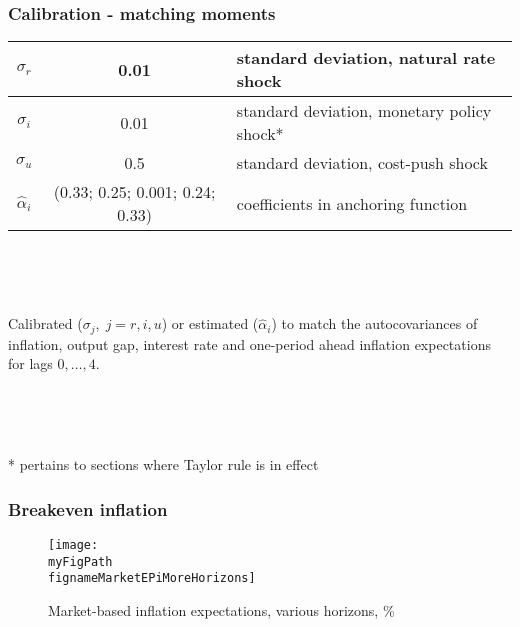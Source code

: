 \documentclass[10pt]{beamer}
\def \myFigPath {../../../figures/}
\def\fignameMarketEPiCleaned{cleaned_epi10_2020_07_28}
\def\fignameMarketEPiMoreHorizons{epi_be_in_data_command_anchoring_in_data_14_Sep_2020_18_12_59}
\begin{document}
\begin{frame}
	\frametitle{Calibration - matching moments}

\small{
\begin{center}
\begin{table}
\begin{tabular}{ c | c  | l }
\hline
    $\sigma_r$ & 0.01 & standard deviation, natural rate shock  \\ \hline
    $\sigma_i$ &  0.01  &standard deviation, monetary policy shock*  \\ \hline
    $\sigma_u$ & 0.5 & standard deviation, cost-push shock   \\ \hline  
    $\hat{\alpha}_i$ &  (0.33;    0.25;    0.001;    0.24;    0.33) & coefficients in anchoring function \\ \hline   
\end{tabular}     
       \label{calibration}
 \end{table}
\end{center}
}

\

\


Calibrated ($\sigma_j, \; j=r,i,u$) or estimated ($\hat{\alpha}_i$) to match the autocovariances of inflation, output gap, interest rate and one-period ahead inflation expectations for lags $0, \dots, 4$.

\

\

\small{* pertains to sections where Taylor rule is in effect}

\end{frame}

\begin{frame}[plain]  %
\frametitle{Breakeven inflation}
	\label{app_TIPS}

\begin{figure}[h!]
\texttt{[image: \\myFigPath \\fignameMarketEPiMoreHorizons]} %
\caption{Market-based inflation expectations, various horizons, \%}
\label{epi_cleaned}
\end{figure}

\vfill 
\hyperlink{LRE_drifting_down}{}	

\end{frame}
\end{document}
